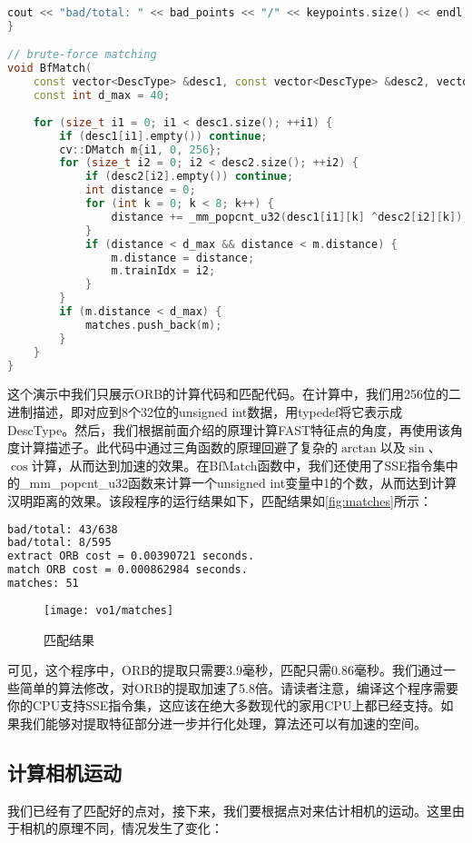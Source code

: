 \begin{lstlisting}[language=c++,caption=slambook2/ch7/orb_self.cpp（片段）]
    cout << "bad/total: " << bad_points << "/" << keypoints.size() << endl;
}

// brute-force matching
void BfMatch(
    const vector<DescType> &desc1, const vector<DescType> &desc2, vector<cv::DMatch> &matches) {
    const int d_max = 40;
    
    for (size_t i1 = 0; i1 < desc1.size(); ++i1) {
        if (desc1[i1].empty()) continue;
        cv::DMatch m{i1, 0, 256};
        for (size_t i2 = 0; i2 < desc2.size(); ++i2) {
            if (desc2[i2].empty()) continue;
            int distance = 0;
            for (int k = 0; k < 8; k++) {
                distance += _mm_popcnt_u32(desc1[i1][k] ^desc2[i2][k]);
            }
            if (distance < d_max && distance < m.distance) {
                m.distance = distance;
                m.trainIdx = i2;
            }
        }
        if (m.distance < d_max) {
            matches.push_back(m);
        }
    }
}
\end{lstlisting}
这个演示中我们只展示ORB的计算代码和匹配代码。在计算中，我们用256位的二进制描述，即对应到8个32位的unsigned int数据，用typedef将它表示成DescType。然后，我们根据前面介绍的原理计算FAST特征点的角度，再使用该角度计算描述子。此代码中通过三角函数的原理回避了复杂的$\arctan$以及$\sin$、$\cos$计算，从而达到加速的效果。在BfMatch函数中，我们还使用了SSE指令集中的\_mm\_popcnt\_u32函数来计算一个unsigned int变量中1的个数，从而达到计算汉明距离的效果。该段程序的运行结果如下，匹配结果如\autoref{fig:matches}所示：

\begin{lstlisting}[language=sh,caption=终端输出：]
bad/total: 43/638
bad/total: 8/595
extract ORB cost = 0.00390721 seconds.
match ORB cost = 0.000862984 seconds.
matches: 51
\end{lstlisting}

\begin{figure}[!htp]
    \centering
    \texttt{[image: vo1/matches]}
    \caption{匹配结果}
    \label{fig:matches}
\end{figure}

可见，这个程序中，ORB的提取只需要3.9毫秒，匹配只需0.86毫秒。我们通过一些简单的算法修改，对ORB的提取加速了5.8倍。请读者注意，编译这个程序需要你的CPU支持SSE指令集，这应该在绝大多数现代的家用CPU上都已经支持。如果我们能够对提取特征部分进一步并行化处理，算法还可以有加速的空间。

\subsection{计算相机运动}
我们已经有了匹配好的点对，接下来，我们要根据点对来估计相机的运动。这里由于相机的原理不同，情况发生了变化：

